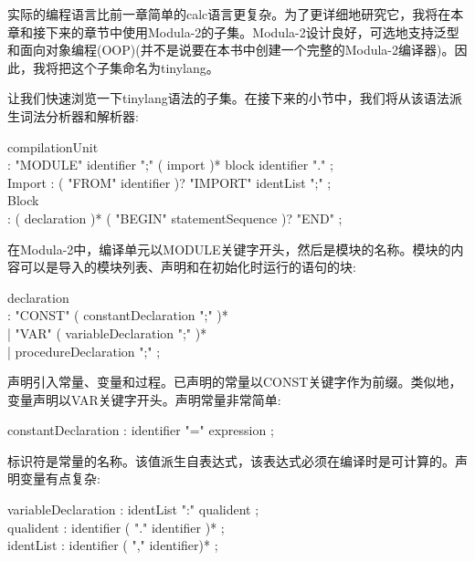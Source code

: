 实际的编程语言比前一章简单的calc语言更复杂。为了更详细地研究它，我将在本章和接下来的章节中使用Modula-2的子集。Modula-2设计良好，可选地支持泛型和面向对象编程(OOP)(并不是说要在本书中创建一个完整的Modula-2编译器)。因此，我将把这个子集命名为tinylang。\par

让我们快速浏览一下tinylang语法的子集。在接下来的小节中，我们将从该语法派生词法分析器和解析器:\par

\begin{tcolorbox}[colback=white,colframe=black]
compilationUnit \\
\hspace*{0.5cm}: "MODULE" identifier ";" ( import )* block identifier "." ; \\
Import : ( "FROM" identifier )? "IMPORT" identList ";" ; \\
Block \\
\hspace*{0.5cm}: ( declaration )* ( "BEGIN" statementSequence )? "END" ;
\end{tcolorbox}

在Modula-2中，编译单元以MODULE关键字开头，然后是模块的名称。模块的内容可以是导入的模块列表、声明和在初始化时运行的语句的块:\par

\begin{tcolorbox}[colback=white,colframe=black]
declaration \\
\hspace*{0.5cm}: "CONST" ( constantDeclaration ";" )* \\
\hspace*{0.5cm}| "VAR" ( variableDeclaration ";" )* \\
\hspace*{0.5cm}| procedureDeclaration ";" ;
\end{tcolorbox}

声明引入常量、变量和过程。已声明的常量以CONST关键字作为前缀。类似地，变量声明以VAR关键字开头。声明常量非常简单:\par

\begin{tcolorbox}[colback=white,colframe=black]
constantDeclaration : identifier "=" expression ;
\end{tcolorbox}

标识符是常量的名称。该值派生自表达式，该表达式必须在编译时是可计算的。声明变量有点复杂:\par

\begin{tcolorbox}[colback=white,colframe=black]
variableDeclaration : identList ":" qualident ; \\
qualident : identifier ( "." identifier )* ; \\
identList : identifier ( "," identifier)* ;
\end{tcolorbox}

